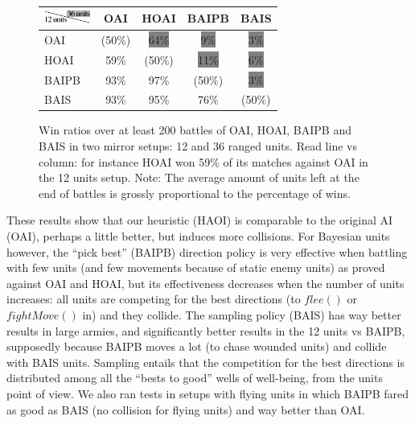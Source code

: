 \begin{figure}[!ht]
\begin{center}
\begin{tabular}{l|c|c|c|c}
\includegraphics[width=1.5cm]{images/array_top2.png} \vspace{-0.05cm} & OAI & HOAI & BAIPB & BAIS \\
\hline
OAI & (50\%) & \colorbox{grey}{64\%} & \colorbox{grey}{9\%} & \colorbox{grey}{3\%} \\
HOAI & 59\% & (50\%) & \colorbox{grey}{11\%} & \colorbox{grey}{6\%} \\
BAIPB & 93\% & 97\% & (50\%) & \colorbox{grey}{3\%} \\
BAIS & 93\% & 95\% & 76\% & (50\%)
\end{tabular}
\end{center}
\label{tab:win_ratios}
\vspace{-0.2cm}
\caption{Win ratios over at least 200 battles of OAI, HOAI, BAIPB and BAIS in two mirror setups: 12 and 36 ranged units. Read line vs column: for instance HOAI won 59\% of its matches against OAI in the 12 units setup. Note: The average amount of units left at the end of battles is grossly proportional to the percentage of wins.}
\end{figure}

These results show that our heuristic (HAOI) is comparable to the original AI (OAI), perhaps a little better, but induces more collisions. For Bayesian units however, the ``pick best'' (BAIPB) direction policy is very effective when battling with few units (and few movements because of static enemy units) as proved against OAI and HOAI, but its effectiveness decreases when the number of units increases: all units are competing for the best directions (to $flee()$ or $fightMove()$ in) and they collide. The sampling policy (BAIS) has way better results in large armies, and significantly better results in the 12 units vs BAIPB, supposedly because BAIPB moves a lot (to chase wounded units) and collide with BAIS units. Sampling entails that the competition for the best directions is distributed among all the ``bests to good'' wells of well-being, from the units point of view. We also ran tests in setups with flying units in which BAIPB fared as good as BAIS (no collision for flying units) and way better than OAI.

